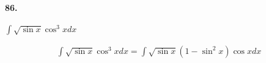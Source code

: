     \paragraph*{86.}
    $\int \sqrt{\sin x}\cos^3 x dx$
    \\
    \begin{mdframed}
        \begin{equation*}
            \begin{gathered}
                \int \sqrt{\sin x}\cos^3 x dx                 
                = \int \sqrt{\sin x} (1 - \sin^2 x) \cos x dx
            \end{gathered}
        \end{equation*}
    \end{mdframed}

